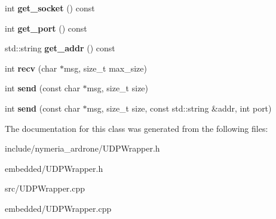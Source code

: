 \begin{DoxyCompactItemize}
\item 
\hypertarget{classUDPServer_afa98d6638cc862fc150867b4a7399ae2}{int {\bfseries get\-\_\-socket} () const }\label{classUDPServer_afa98d6638cc862fc150867b4a7399ae2}

\item 
\hypertarget{classUDPServer_a3fd4e5a227d9b417bcbf8e88268d200a}{int {\bfseries get\-\_\-port} () const }\label{classUDPServer_a3fd4e5a227d9b417bcbf8e88268d200a}

\item 
\hypertarget{classUDPServer_a736dde370ce9eb0d474a5fad266111fb}{std\-::string {\bfseries get\-\_\-addr} () const }\label{classUDPServer_a736dde370ce9eb0d474a5fad266111fb}

\item 
\hypertarget{classUDPServer_a69e88e5fcdeee3f0e9c5fe3cdfba9a74}{int {\bfseries recv} (char $\ast$msg, size\-\_\-t max\-\_\-size)}\label{classUDPServer_a69e88e5fcdeee3f0e9c5fe3cdfba9a74}

\item 
\hypertarget{classUDPServer_ae8585a5e5fd62713a970be89a99498ee}{int {\bfseries send} (const char $\ast$msg, size\-\_\-t size)}\label{classUDPServer_ae8585a5e5fd62713a970be89a99498ee}

\item 
\hypertarget{classUDPServer_a59a89ed608c268960cafc460601dcb39}{int {\bfseries send} (const char $\ast$msg, size\-\_\-t size, const std\-::string \&addr, int port)}\label{classUDPServer_a59a89ed608c268960cafc460601dcb39}

\end{DoxyCompactItemize}


\-The documentation for this class was generated from the following files\-:\begin{DoxyCompactItemize}
\item 
include/nymeria\-\_\-ardrone/\-U\-D\-P\-Wrapper.\-h\item 
embedded/\-U\-D\-P\-Wrapper.\-h\item 
src/\-U\-D\-P\-Wrapper.\-cpp\item 
embedded/\-U\-D\-P\-Wrapper.\-cpp\end{DoxyCompactItemize}
